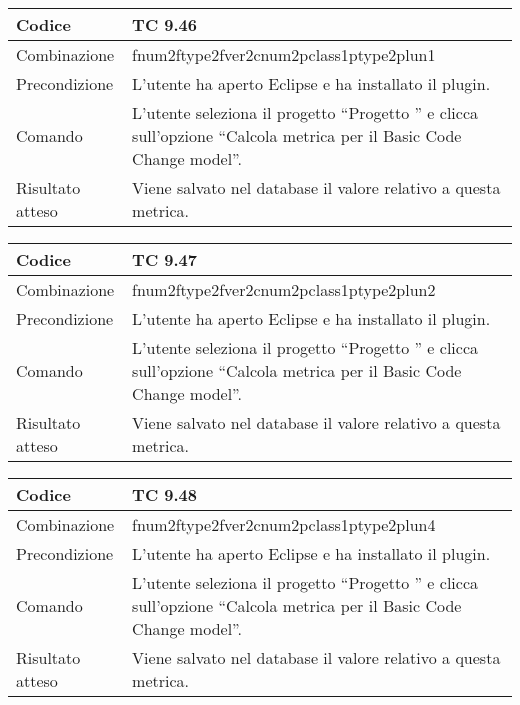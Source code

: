 \begin{table}[ht]
\begin{tabular}{|p{3cm}|p{9cm}|}
\hline
\cellcolor{lightgray}Codice				& TC 9.46								\\
\hline
\cellcolor{lightgray}Combinazione		& fnum2ftype2fver2cnum2pclass1ptype2plun1									\\
\hline
\cellcolor{lightgray}Precondizione		& L'utente ha aperto Eclipse e ha installato il plugin.		\\
\hline
\cellcolor{lightgray}Comando			& L'utente seleziona il progetto ``Progetto ''  e clicca sull'opzione ``Calcola metrica per il Basic Code Change model''.	\\
\hline
\cellcolor{lightgray}Risultato atteso	& Viene salvato nel database il valore relativo a questa metrica.\\
\hline
\end{tabular}
\end{table}

\begin{table}[ht]
\begin{tabular}{|p{3cm}|p{9cm}|}
\hline
\cellcolor{lightgray}Codice				& TC 9.47								\\
\hline
\cellcolor{lightgray}Combinazione		& fnum2ftype2fver2cnum2pclass1ptype2plun2									\\
\hline
\cellcolor{lightgray}Precondizione		& L'utente ha aperto Eclipse e ha installato il plugin.		\\
\hline
\cellcolor{lightgray}Comando			& L'utente seleziona il progetto ``Progetto ''  e clicca sull'opzione ``Calcola metrica per il Basic Code Change model''.	\\
\hline
\cellcolor{lightgray}Risultato atteso	& Viene salvato nel database il valore relativo a questa metrica.\\
\hline
\end{tabular}
\end{table}

\begin{table}[ht]
\begin{tabular}{|p{3cm}|p{9cm}|}
\hline
\cellcolor{lightgray}Codice				& TC 9.48								\\
\hline
\cellcolor{lightgray}Combinazione		& fnum2ftype2fver2cnum2pclass1ptype2plun4									\\
\hline
\cellcolor{lightgray}Precondizione		& L'utente ha aperto Eclipse e ha installato il plugin.		\\
\hline
\cellcolor{lightgray}Comando			& L'utente seleziona il progetto ``Progetto ''  e clicca sull'opzione ``Calcola metrica per il Basic Code Change model''.	\\
\hline
\cellcolor{lightgray}Risultato atteso	& Viene salvato nel database il valore relativo a questa metrica.\\
\hline
\end{tabular}
\end{table}


